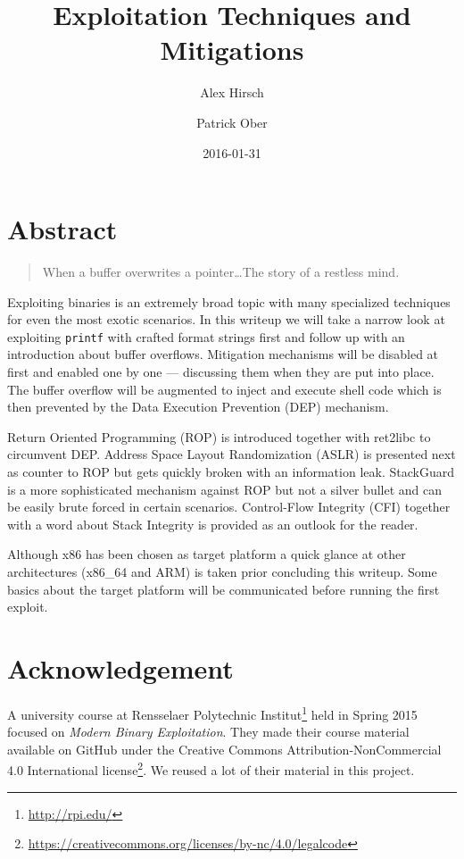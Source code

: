\documentclass[article]{uibk}
\title{Exploitation Techniques and Mitigations}
\author{Alex Hirsch \and Patrick Ober}
\date{2016-01-31}
\begin{document}
\maketitle

\section*{Abstract}
\label{sec:abstract}

\begin{quote}
    When a buffer overwrites a pointer\dots\enspace The story of a restless
    mind.
\end{quote}

Exploiting binaries is an extremely broad topic with many specialized
techniques for even the most exotic scenarios. In this writeup we will take a
narrow look at exploiting \texttt{printf} with crafted format strings first and
follow up with an introduction about buffer overflows. Mitigation mechanisms
will be disabled at first and enabled one by one --- discussing them when they
are put into place. The buffer overflow will be augmented to inject and execute
shell code which is then prevented by the Data Execution Prevention (DEP)
mechanism.

Return Oriented Programming (ROP) is introduced together with ret2libc to
circumvent DEP. Address Space Layout Randomization (ASLR) is presented next as
counter to ROP but gets quickly broken with an information leak. StackGuard is
a more sophisticated mechanism against ROP but not a silver bullet and can be
easily brute forced in certain scenarios. Control-Flow Integrity (CFI) together
with a word about Stack Integrity is provided as an outlook for the reader.

Although x86 has been chosen as target platform a quick glance at other
architectures (x86\_64 and ARM) is taken prior concluding this writeup. Some
basics about the target platform will be communicated before running the first
exploit.

\setcounter{tocdepth}{1}
\tableofcontents

\newpage

\section*{Acknowledgement}

A university course at Rensselaer Polytechnic
Institut\footnote{\url{http://rpi.edu/}} held in Spring 2015 focused on
\textit{Modern Binary Exploitation}. They made their course material available
on GitHub \cite{rpisec} under the Creative Commons Attribution-NonCommercial
4.0 International
license\footnote{\url{https://creativecommons.org/licenses/by-nc/4.0/legalcode}}.
We reused a lot of their material in this project.
\end{document}
